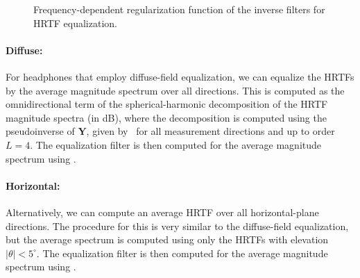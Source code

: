 \begin{figure}[t]
\centering

\caption[Frequency-dependent regularization function for HRTF equalization.]{
Frequency-dependent regularization function of the inverse filters for HRTF equalization.}
\label{fig:A2_SABRE_Toolkit:Farina_Regularization}
\end{figure}

\paragraph*{Diffuse:} For headphones that employ diffuse-field equalization,
we can equalize the HRTFs by the average magnitude spectrum over all directions.
This is computed as the omnidirectional term of the spherical-harmonic decomposition of the HRTF magnitude spectra (in dB),
where the decomposition is computed using the pseudoinverse of $\mathbf{Y}$, given by~ for all measurement directions and up to order $L = 4$.
The equalization filter is then computed for the average magnitude spectrum using .

\paragraph*{Horizontal:} Alternatively, we can compute an average HRTF over all horizontal-plane directions.
The procedure for this is very similar to the diffuse-field equalization, but the average spectrum is computed using only the HRTFs with elevation $|\theta| < 5^\circ$.
The equalization filter is then computed for the average magnitude spectrum using .